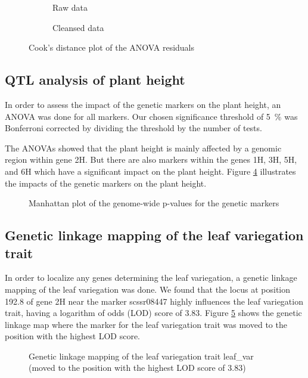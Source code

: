 \begin{figure}[htbp]
    \begin{subfigure}[t]{.48\textwidth}
        
        \caption{Raw data}
        \label{fig:raw_aov_height_residuals_cooks_dist}
    \end{subfigure}
    \begin{subfigure}[t]{.48\textwidth}
        
        \caption{Cleansed data}
        \label{fig:clean_aov_height_residuals_cooks_dist}
    \end{subfigure}
    \caption{Cook's distance plot of the ANOVA residuals}
    \label{fig:aov_height_residuals_cooks_dist}
\end{figure}

\subsection{QTL analysis of plant height}

In order to assess the impact of the genetic markers on the plant height, an ANOVA was done for all markers. Our chosen significance threshold of \qty{5}{\percent} was Bonferroni corrected by dividing the threshold by the number of tests.

The ANOVAs showed that the plant height is mainly affected by a genomic region within gene 2H. But there are also markers within the genes 1H, 3H, 5H, and 6H which have a significant impact on the plant height. Figure \ref{fig:clean_height_marker_effects_manhattan} illustrates the impacts of the genetic markers on the plant height.

\begin{figure}[htbp]
    
    \caption{Manhattan plot of the genome-wide p-values for the genetic markers}
    \label{fig:clean_height_marker_effects_manhattan}
\end{figure}

\subsection{Genetic linkage mapping of the leaf variegation trait}

In order to localize any genes determining the leaf variegation, a genetic linkage mapping of the leaf variegation was done. We found that the locus at position \num{192.8} of gene 2H near the marker scssr08447 highly influences the leaf variegation trait, having a logarithm of odds (LOD) score of \num{3.83}. Figure \ref{fig:link_map_leaf_variegation} shows the genetic linkage map where the marker for the leaf variegation trait was moved to the position with the highest LOD score.

\begin{figure}[htbp]
    
    \caption{Genetic linkage mapping of the leaf variegation trait leaf\_var (moved to the position with the highest LOD score of \num{3.83})}
    \label{fig:link_map_leaf_variegation}
\end{figure}
